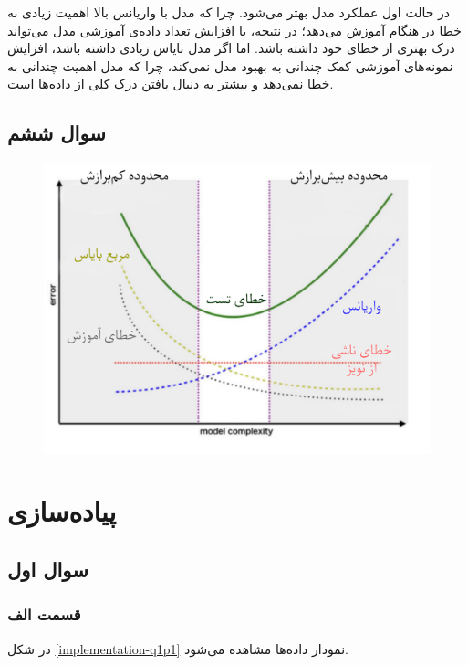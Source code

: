 \documentclass[14pt,a4]{article}
\begin{document}
در حالت اول عملکرد مدل بهتر می‌شود. چرا که مدل با واریانس بالا اهمیت زیادی به خطا در هنگام آموزش
می‌دهد؛‌ در نتیجه، با افزایش تعداد داده‌ی آموزشی مدل می‌تواند درک بهتری از خطا‌ی خود داشته باشد.
اما اگر مدل بایاس زیادی داشته باشد، افزایش نمونه‌های آموزشی کمک چندانی به بهبود مدل نمی‌کند،
چرا که مدل اهمیت چندانی به خطا نمی‌دهد و بیشتر به دنبال یافتن درک کلی از داده‌ها است.

\newpage

\subsection*{سوال ششم}

\begin{figure}[h]
    \centering
    \includegraphics[width=\linewidth]{images/q6.png}
\end{figure}

\newpage

\section*{پیاده‌سازی}

\subsection*{سوال اول}

\subsubsection*{قسمت الف}

در شکل \ref{implementation-q1p1} نمودار داده‌ها مشاهده می‌شود.
\end{document}
